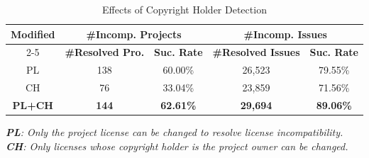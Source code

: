 \begin{table}[t]
	\centering
	\footnotesize
	\caption{Effects of Copyright Holder Detection} \label{tab:copyright}
	\begin{tabular}{ccc|cc}
		\toprule
		\multirow{2}{*}{\textbf{Modified}} & \multicolumn{2}{c|}{\textbf{\#Incomp. Projects}} & \multicolumn{2}{c}{\textbf{\#Incomp. Issues}}\\\cline{2-5}
		 & {\textbf{\#Resolved Pro.}} & \textbf{Suc. Rate} & \textbf{\#Resolved Issues}& \textbf{Suc. Rate} \\
		\hline
		{PL}   & 138 & 60.00\% & 26,523 & 79.55\%  \\
		{CH}   & 76 & 33.04\% & 23,859 & 71.56\%  \\
	  \textbf{PL+CH}  & \textbf{144} & \textbf{62.61\%} & \textbf{29,694} & \textbf{89.06\%}  \\
		\bottomrule
	\end{tabular}%
\begin{center}
	    \footnotesize
	    {\textit{\textbf{PL}: Only the project license can be changed to resolve license incompatibility.}\\
	    \textit{\textbf{CH}: Only licenses whose copyright holder is the project owner can be changed.}}
\end{center}
\end{table}

\noindent {}




